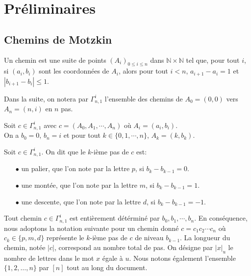 \chapter{Préliminaires}
\section{Chemins de Motzkin}

\begin{definition}
	\begin{rm}
		Un chemin est une suite de points $(A_{i})_{0 \leq i \leq n}$ dans $\mathbb{N}\times \mathbb{N}$ tel que, pour tout $i$, si $
			(a_{i}, b_{i})$ sont les coordonnées de $A_{i}$, alors pour tout $i<n$, $a_{i+1} - a_{i}=1$ et $|b_{i+1} - b_{i}| \leq 1$.
	\end{rm}
\end{definition}
Dans la suite, on notera par $\Gamma_{n,1}^{i}$ l'ensemble des chemins de $A_{0} = (0,0)$ vers $A_{n} = (n,i)$ en $n$ pas.

\begin{property}
	Soit $c \in \Gamma_{n,1}^{i}$ avec $c=(A_{0},A_{1}, \cdots, A_{n})$ où $A_{i}=(a_{i}, b_{i})$.\\
	On a $b_{0}=0$, $b_{n}=i$ et pour tout $k \in \{0, 1, \cdots, n\}$, $A_{k} = (k, b_{k})$.
\end{property}

\begin{definition} \label{path_char}
	\begin{rm}
		Soit $c \in \Gamma_{n,1}^{i}$. On dit que le $k$-ième pas de $c$ est:
		\begin{itemize}
			\item[$\bullet$] un palier, que l'on note par la lettre $p$, si $b_{k}- b_{k-1} = 0$.
			\item[$\bullet$] une montée, que l'on note par la lettre $m$, si $b_{k}- b_{k-1} = 1$.
			\item[$\bullet$] une descente, que l'on note par la lettre $d$, si $b_{k}- b_{k-1} = -1$.
		\end{itemize}
	\end{rm}
\end{definition}
Tout chemin $c \in \Gamma_{n,1}^{i}$ est entièrement détérminé par $b_{0}, b_{1}, \cdots, b_{n}$.
En conséquence, nous adoptons la notation suivante pour un chemin donné
$c = c_{1}c_{2}\cdots c_{n}$ où \\$c_{k} \in \{p, m, d\}$ représente le $k$-ième pas de $c$ de niveau $b_{k-1}$. La longueur du chemin, notée $|c|$, correspond au nombre total de pas. On désigne par $|x|_{u}$ le nombre de lettres dans le mot $x$ égale à $u$. Nous notons également l'ensemble $\{1, 2, \ldots, n\}$ par $[n]$ tout au long du document.

